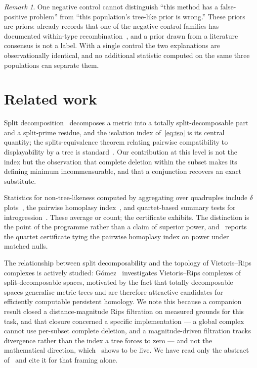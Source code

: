 \documentclass[11pt,a4paper]{article}
\theoremstyle{definition}
\theoremstyle{remark}
\newtheorem{remark}{Remark}[section]
\begin{document}
\begin{remark}
One negative control cannot distinguish ``this method has a false-positive
problem'' from ``this population's tree-like prior is wrong.'' These priors are
priors: \cite{paperf} already records that one of the negative-control families
has documented within-type recombination~\cite{murahwa}, and a prior drawn from a
literature consensus is not a label. With a single control the two explanations
are observationally identical, and no additional statistic computed on the same
three populations can separate them.
\end{remark}

\section{Related work}\label{sec:related}

Split decomposition~\cite{bandeltdress} decomposes a metric into a totally
split-decomposable part and a split-prime residue, and the isolation index
of~\eqref{eq:iso} is its central quantity; the splits-equivalence theorem
relating pairwise compatibility to displayability by a tree is
standard~\cite{semplesteel}. Our contribution at this level is not the index but
the observation that complete deletion within the subset makes its defining
minimum incommensurable, and that a conjunction recovers an exact substitute.

Statistics for non-tree-likeness computed by aggregating over quadruples include
$\delta$ plots~\cite{deltaplots}, the pairwise homoplasy index~\cite{bruen}, and
quartet-based summary tests for introgression~\cite{frankelane}. These average or
count; the certificate exhibits. The distinction is the point of the programme
rather than a claim of superior power, and~\cite{paperf} reports the quartet
certificate tying the pairwise homoplasy index on power under matched nulls.

The relationship between split decomposability and the topology of
Vietoris--Rips complexes is actively studied: Gómez~\cite{gomez} investigates
Vietoris--Rips complexes of split-decomposable spaces, motivated by the fact that
totally decomposable spaces generalise metric trees and are therefore attractive
candidates for efficiently computable persistent homology. We note this because a
companion result closed a distance-magnitude Rips filtration on measured grounds
for this task, and that closure concerned a specific implementation --- a global
complex cannot use per-subset complete deletion, and a magnitude-driven
filtration tracks divergence rather than the index a tree forces to zero --- and
not the mathematical direction, which~\cite{gomez} shows to be live. We have read
only the abstract of~\cite{gomez} and cite it for that framing alone.
\end{document}
